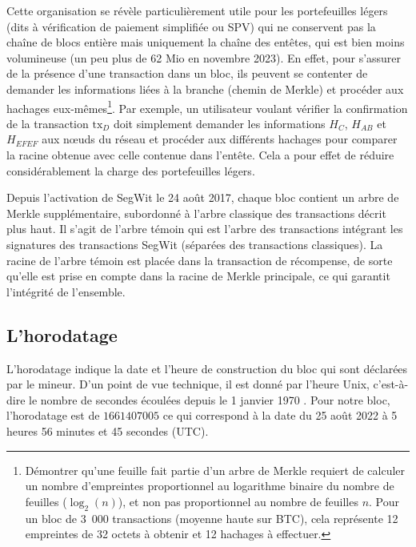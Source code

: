 Cette organisation se révèle particulièrement utile pour les portefeuilles légers (dits à vérification de paiement simplifiée ou SPV) qui ne conservent pas la chaîne de blocs entière mais uniquement la chaîne des entêtes, qui est bien moins volumineuse (un peu plus de 62 Mio en novembre 2023). En effet, pour s'assurer de la présence d'une transaction dans un bloc, ils peuvent se contenter de demander les informations liées à la branche (chemin de Merkle) et procéder aux hachages eux-mêmes\footnote{Démontrer qu'une feuille fait partie d'un arbre de Merkle requiert de calculer un nombre d'empreintes proportionnel au logarithme binaire du nombre de feuilles ($\log_{2}(n)$), et non pas proportionnel au nombre de feuilles $n$. Pour un bloc de 3~000 transactions (moyenne haute sur BTC), cela représente 12 empreintes de 32 octets à obtenir et 12 hachages à effectuer.}. Par exemple, un utilisateur voulant vérifier la confirmation de la transaction $\mathrm{tx}_D$ doit simplement demander les informations $H_C$, $H_{A\!B}$ et $H_{E\!F\!E\!F}$ aux nœuds du réseau et procéder aux différents hachages pour comparer la racine obtenue avec celle contenue dans l'entête. Cela a pour effet de réduire considérablement la charge des portefeuilles légers.

Depuis l'activation de SegWit le 24 août 2017, chaque bloc contient un arbre de Merkle supplémentaire, subordonné à l'arbre classique des transactions décrit plus haut. Il s'agit de l'arbre témoin qui est l'arbre des transactions intégrant les signatures des transactions SegWit (séparées des transactions classiques). La racine de l'arbre témoin est placée dans la transaction de récompense, de sorte qu'elle est prise en compte dans la racine de Merkle principale, ce qui garantit l'intégrité de l'ensemble.


\subsection{L'horodatage} L'horodatage indique la date et l'heure de construction du bloc qui sont déclarées par le mineur. D'un point de vue technique, il est donné par l'heure Unix, c'est-à-dire le nombre de secondes écoulées depuis le 1\ier{} janvier 1970 . Pour notre bloc, l'horodatage est de $1661407005$ ce qui correspond à la date du 25 août 2022 à 5 heures 56 minutes et 45 secondes (UTC).


